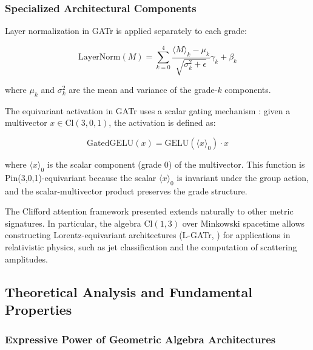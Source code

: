 \subsubsection{Specialized Architectural Components}

\begin{definition}\label{def:normalizacion_grado}
Layer normalization in GATr is applied separately to each grade:

\begin{equation}
    \text{LayerNorm}(M) = \sum_{k=0}^4 \frac{\langle M \rangle_k - \mu_k}{\sqrt{\sigma_k^2 + \epsilon}} \gamma_k + \beta_k
\end{equation}

where $\mu_k$ and $\sigma_k^2$ are the mean and variance of the grade-$k$ components.
\end{definition}

\begin{definition}\label{def:activacion_equivariante_gatr}
The equivariant activation in GATr uses a scalar gating mechanism \citep{brehmer2023geometric}: given a multivector $x \in \text{Cl}(3,0,1)$, the activation is defined as:

\begin{equation}
    \text{GatedGELU}(x) = \text{GELU}(\langle x \rangle_0) \cdot x
\end{equation}

where $\langle x \rangle_0$ is the scalar component (grade 0) of the multivector. This function is Pin(3,0,1)-equivariant because the scalar $\langle x \rangle_0$ is invariant under the group action, and the scalar-multivector product preserves the grade structure.
\end{definition}

The Clifford attention framework presented extends naturally to other metric signatures. In particular, the algebra $\text{Cl}(1,3)$ over Minkowski spacetime allows constructing Lorentz-equivariant architectures (L-GATr, \citet{spinner2024lgatr}) for applications in relativistic physics, such as jet classification and the computation of scattering amplitudes.

\subsection{Theoretical Analysis and Fundamental Properties}

\subsubsection{Expressive Power of Geometric Algebra Architectures}

